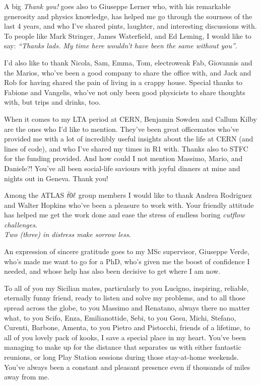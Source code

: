 A big \emph{Thank you!} goes also to Giuseppe Lerner who, with his remarkable generosity and physics knowledge, has helped me go through the sourness of the last 4 years, and who I've shared pints, laughter, and interesting discussions with. To people like Mark Stringer, James Waterfield, and Ed Leming, I would like to say: \emph{``Thanks lads. My time here wouldn't have been the same without you''}.

I'd also like to thank Nicola, Sam, Emma, Tom, electroweak Fab, Giovannis and the Marios, who've been a good company to share the office with, and Jack and Rob for having shared the pain of living in a crappy house. Special thanks to Fabione and Vangelis, who've not only been good physicists to share thoughts with, but trips and drinks, too.

When it comes to my \textsc{LTA} period at \textsc{CERN}, Benjamin Sowden and Callum Kilby are the ones who I'd like to mention. They've been great officemates who've provided me with a lot of incredibly useful insights about the life at \textsc{CERN} (and lines of code), and who I've shared my times in \textsc{R1} with. Thanks also to STFC for the funding provided. And how could I not mention Massimo, Mario, and Daniele?! You've all been social-life saviours with joyful dinners at mine and nights out in Geneva. Thank you! 

Among the \textsc{ATLAS} $\tilde{t}0\ell$ group members I would like to thank Andrea Rodriguez and Walter Hopkins who've been a pleasure to work with. Your friendly attitude has helped me get the work done and ease the stress of endless boring \emph{cutflow challenges}.\\\emph{Two (three) in distress make sorrow less}.

An expression of sincere gratitude goes to my MSc supervisor, Giuseppe Verde, who's made me want to go for a PhD, who's given me the boost of confidence I needed, and whose help has also been decisive to get where I am now. 

To all of you my Sicilian mates, particularly to you Lucìgno, inspiring, reliable, eternally funny friend, ready to listen and solve my problems, and to all those spread across the globe, to you Massimo and Renatano, always there no matter what, to you Scifo, Enza, Emilianottide, Sebi, to you Gesu, Michi, Stefano, Curenti, Barbone, Amenta, to you Pietro and Pistocchi, friends of a lifetime, to all of you lovely pack of kooks, I save a special place in my heart. You've been managing to make up for the distance that separates us with either fantastic reunions, or long Play Station sessions during those stay-at-home weekends. You've always been a constant and pleasant presence even if thousands of miles away from me.

